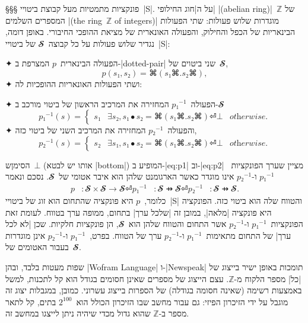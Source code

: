 §§§ פונקציות מתמטיות מעל קבוצת ביטויי~\E|S|.
על ה\ע|חוג החילופי| \E|(abelian ring)|~$ℤ$ של המספרים השלמים \E|(the ring~$ℤ$
of integers)| מוגדרות שלוש פעולות: שתי הפעולות הבינאריות של הכפל והחילוק,
והפעולה האונארית של מציאת ההופכי החיבורי. באופן דומה, נגדיר שלוש פעולות על כל
קבוצה~$𝓢$ של ביטויי~\E|S|:
\begin{enumerate}
  ✦ הפעולה הבינארית~$p$ המצרפת ב-\E|dotted-pair| שני ביטוים של~$𝓢$,
  \begin{equation}
    p(s₁,s₂)=⌘(s₁⌘.s₂⌘),
  \end{equation}
  ✦ ושתי הפעולות האונאריות ההופכיות לה:
  \begin{enumerate}
    ✦ הפעולה~$p₁^{-1}$ המחזירה את המרכיב
    הראשון של ביטוי מורכב ב-$𝓢$
    \begin{equation}\label{eq:p1}
      p₁^{-1}(s)=\begin{cases}
        s₁ & ∃ s₂, s₁ ∙ s₂=⌘(s₁⌘.s₂⌘) ⏎
        ⊥  & \textit{otherwise}.
      \end{cases}
    \end{equation}
    ✦ והפעולה~$p₂^{-1}$ המחזירה את המרכיב השני של ביטוי כזה,
    \begin{equation}\label{eq:p2}
      p₂^{-1}(s)=\begin{cases}
        s₂ & ∃ s₁, s₁ ∙ s₂=⌘(s₁⌘.s₂⌘) ⏎
        ⊥  & \textit{otherwise}.
      \end{cases}
    \end{equation}
  \end{enumerate}
\end{enumerate}
הסימןש~$⊥$ (אותו יש לבטא \E|bottom|) המופיע ב-|eq:p1| וב-|eq:p2|
מציין שערך הפונקציות~$p₁^{-1}$ ו-$p₂^{-1}$ אינו מוגדר כאשר הארגומנט שלהן הוא
איבר אטומי של~$𝓢$. נסכם ונאמר
\begin{equation}
  \begin{split}
    p&:𝓢×𝓢→𝓢⏎
    p₁^{-1}&:𝓢 ⇸𝓢⏎
    p₂^{-1}&:𝓢 ⇸𝓢.
  \end{split}
\end{equation}
כלומר,~$p$ היא פונקציה שהתחום הוא זוג של ביטויי~\E|S| והטווח שלה הוא ביטוי כזה.
הפונקציה היא פונקציה \ע|מלאה|, במובן זה \ע|שלכל ערך| בתחום, ממופה ערך בטווח.
לעומת זאת הפונקציות~$p₁^{-1}$ ו-$p₂^{-1}$ אשר התחום והטווח שלהן הוא~$𝓢$, הן
פונקציות חלקיות. שכן \ע|לא לכל ערך| של התחום מתאימות~$p₁^{-1}$ ו-$p₂^{-1}$ ערך
של הטווח. בפרט,~$p₁^{-1}$ ו-$p₂^{-1}$ אינן מוגדרות בעבור האטומים של~$𝓢$.

שפות מעטות בלבד, ובהן \E|Wofram Language| ו-\E|Newspeak| תומכות באופן ישיר
בייצוג של \ע|כל| מספר הלקוח מ-$ℤ$. עצם הייצוג של מספרים שאינן חסומים בגודל
הוא קל לתכנות, למשל באמצעות רשימה (שאינה חסומה בגודלה) של הספרות בייצוג עשרוני.
כמובן, במגבלות יצוג זה מוגבל על ידי הזיכרון הפיזי: גם עבור מחשב שבו הזיכרון
הכולל הוא~$2^{100}$ בתים, קל לתאר מספר ב-$ℤ$ שהוא גדול מכדי שיהיה ניתן לייצגו
במחשב זה.

